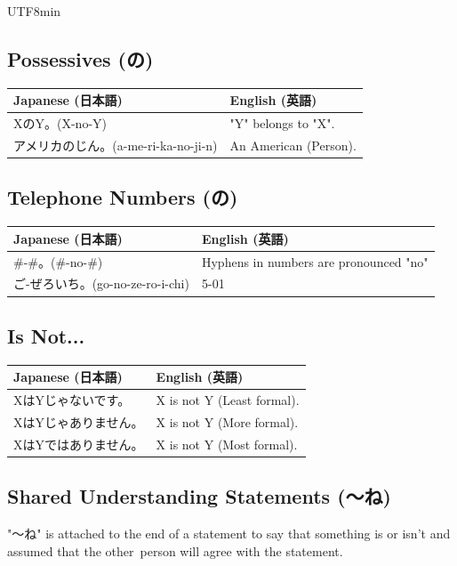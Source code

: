 \documentclass[11pt]{article}
\begin{document}
\begin{CJK}{UTF8}{min}
\vspace{25pt}
\subsection{Possessives (の)}
\begin{tabularx}{\textwidth}{X | X}
    \textbf{Japanese (日本語)} & \textbf{English (英語)} \\
    \midrule
    XのY。(X-no-Y) & "Y" belongs to "X". \\
    アメリカのじん。(a-me-ri-ka-no-ji-n) & An American (Person). \\
    \bottomrule
\end{tabularx}

\vspace{25pt}
\subsection{Telephone Numbers (の)}
\begin{tabularx}{\textwidth}{X | X}
    \textbf{Japanese (日本語)} & \textbf{English (英語)} \\
    \midrule
    \#-\#。(\#-no-\#) & Hyphens in numbers are pronounced "no" \\
    ご-ぜろいち。(go-no-ze-ro-i-chi) & 5-01 \\
    \bottomrule
\end{tabularx}

\vspace{25pt}
\subsection{Is Not...}
\begin{tabularx}{\textwidth}{X | X}
    \textbf{Japanese (日本語)} & \textbf{English (英語)} \\
    \midrule
    XはYじゃないです。 & X is not Y (Least formal). \\
    XはYじゃありません。 & X is not Y (More formal). \\
    XはYではありません。 & X is not Y (Most formal). \\
    \bottomrule
\end{tabularx}

\newpage
\subsection{Shared Understanding Statements (〜ね)}

"〜ね" is attached to the end of a statement to say that something is or isn't and assumed that the other\
person will agree with the statement.


\end{CJK}
\end{document}
